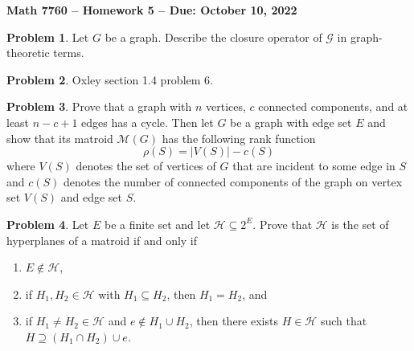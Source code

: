 \documentclass[letterpaper,11pt]{amsart}
\theoremstyle{plain}
\theoremstyle{definition}
\newtheorem{pr}{Problem}
\theoremstyle{remark}
\begin{document}
\Large

\begin{center}
{\bf Math 7760 -- Homework  5 --  Due:  October 10, 2022}
\end{center}

\normalsize


\bigskip


\bigskip

\begin{pr}
    Let $G$ be a graph. Describe the closure operator of $\mathcal{G}$ in graph-theoretic terms.
\end{pr}

\begin{pr}
    Oxley section 1.4 problem 6.
\end{pr}

\bigskip

\bigskip

\begin{pr}
    Prove that a graph with $n$ vertices, $c$ connected components, and at least $n - c + 1$ edges has a cycle.
    Then let $G$ be a graph with edge set $E$ and show that its matroid $\mathcal{M}(G)$
    has the following rank function
    \[
        \rho(S) = |V(S)| - c(S)
    \]
    where $V(S)$ denotes the set of vertices of $G$ that are incident to some edge in $S$ and $c(S)$ denotes the number of connected components of the graph on vertex set $V(S)$ and edge set $S$.
\end{pr}

\begin{pr}
    Let $E$ be a finite set and let $\mathcal{H} \subseteq 2^E$.
    Prove that $\mathcal{H}$ is the set of hyperplanes of a matroid if and only if
    \begin{enumerate}
        \item $E \notin \mathcal{H}$,
        \item if $H_1,H_2 \in \mathcal{H}$ with $H_1 \subseteq H_2$, then $H_1 = H_2$, and
        \item if $H_1\neq H_2 \in \mathcal{H}$ and $e \notin H_1 \cup H_2$, then there exists $H \in \mathcal{H}$
        such that $H \supseteq (H_1 \cap H_2) \cup e$.
    \end{enumerate}
\end{pr}
\end{document}
